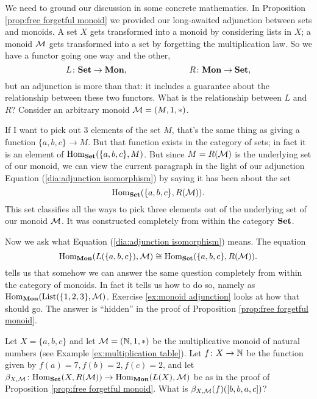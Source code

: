 \documentclass[CT4S-EN-RU]{subfiles}
\begin{document}
\begin{example}

We need to ground our discussion in some concrete mathematics. In Proposition \ref{prop:free forgetful monoid} we provided our long-awaited adjunction between sets and monoids. A set $X$ gets transformed into a monoid by considering lists in $X$; a monoid $\mathcal{M}$ gets transformed into a set by forgetting the multiplication law. So we have a functor going one way and the other, 
$$L\colon{\bf Set}\rightarrow{\bf Mon},\hspace{1in}R\colon{\bf Mon}\rightarrow{\bf Set},$$
but an adjunction is more than that: it includes a guarantee about the relationship between these two functors. What is the relationship between $L$ and $R$? Consider an arbitrary monoid $\mathcal{M}=(M,1,*)$.

If I want to pick out 3 elements of the set $M$, that's the same thing as giving a function $\{a,b,c\}\to M$. But that function exists in the category of sets; in fact it is an element of $\textnormal{Hom}_{\bf Set}(\{a,b,c\},M)$. But since $M=R(\mathcal{M})$ is the underlying set of our monoid, we can view the current paragraph in the light of our adjunction Equation (\ref{dia:adjunction isomorphism}) by saying it has been about the set
$$\textnormal{Hom}_{\bf Set}(\{a,b,c\},R(\mathcal{M})).$$
This set classifies all the ways to pick three elements out of the underlying set of our monoid $\mathcal{M}$. It was constructed completely from within the category ${\bf Set}$.

Now we ask what Equation (\ref{dia:adjunction isomorphism}) means. The equation
$$\textnormal{Hom}_{\bf Mon}(L(\{a,b,c\}),\mathcal{M})\cong\textnormal{Hom}_{\bf Set}(\{a,b,c\},R(\mathcal{M})).$$
tells us that somehow we can answer the same question completely from within the category of monoids. In fact it tells us how to do so, namely as $\textnormal{Hom}_{\bf Mon}(\textnormal{List}(\{1,2,3\},\mathcal{M})$.  Exercise \ref{ex:monoid adjunction} looks at how that should go. The answer is “hidden” in the proof of Proposition \ref{prop:free forgetful monoid}.

\end{example}

\begin{exercise}\label{ex:monoid adjunction}
Let $X=\{a,b,c\}$ and let $\mathcal{M}=({\mathbb N},1,*)$ be the multiplicative monoid of natural numbers (see Example \ref{ex:multiplication table}). Let $f\colon X\rightarrow{\mathbb N}$ be the function given by $f(a)=7, f(b)=2, f(c)=2$, and let $\beta_{X,\mathcal{M}}\colon\textnormal{Hom}_{\bf Set}(X,R(\mathcal{M}))\rightarrow\textnormal{Hom}_{\bf Mon}(L(X),\mathcal{M})$ be as in the proof of Proposition \ref{prop:free forgetful monoid}. What is $\beta_{X,\mathcal{M}}(f)([b,b,a,c])$?
\end{exercise}
\end{document}

